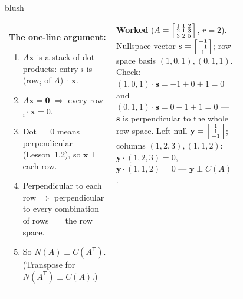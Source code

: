 \documentclass[10pt]{article}
\newcommand{\xx}{\mathbf{x}}
\newcommand{\yy}{\mathbf{y}}
\newcommand{\svec}{\mathbf{s}}
\newcommand{\zero}{\mathbf{0}}
\newcommand{\T}{\mathsf{T}}
\begin{document}
\begin{skillbox}{blush}
\begin{tabularx}{\linewidth}{@{}p{0.46\linewidth} X@{}}
\textbf{The one-line argument:}
\begin{enumerate}[leftmargin=1.3em, nosep]
  \item $A\xx$ is a stack of dot products: entry $i$ is (row$_i$ of $A$)$\,\cdot\,\xx$.
  \item $A\xx=\zero$ $\Rightarrow$ every row$_i\cdot\xx=0$.
  \item Dot $=0$ means perpendicular (Lesson~1.2), so $\xx\perp$ each row.
  \item Perpendicular to each row $\Rightarrow$ perpendicular to every combination of rows $=$ the row space.
  \item So $N(A)\perp C(A^{\T})$. (Transpose for $N(A^{\T})\perp C(A)$.)
\end{enumerate}
&
\vspace{-2pt}
\textbf{Worked} ($A=\begin{bsmallmatrix} 1&1&2\\2&1&3\\3&2&5 \end{bsmallmatrix}$, $r=2$). Nullspace vector
$\svec=\begin{bsmallmatrix} -1\\-1\\1 \end{bsmallmatrix}$; row space basis $(1,0,1),(0,1,1)$.
Check: $(1,0,1)\cdot\svec=-1+0+1=0$ and $(0,1,1)\cdot\svec=0-1+1=0$ --- $\svec$ is perpendicular to the whole
row space. Left-null $\yy=\begin{bsmallmatrix} 1\\1\\-1 \end{bsmallmatrix}$; columns
$(1,2,3),(1,1,2)$: $\yy\cdot(1,2,3)=0$, $\yy\cdot(1,1,2)=0$ --- $\yy\perp C(A)$.
\end{tabularx}
\end{skillbox}
\end{document}
